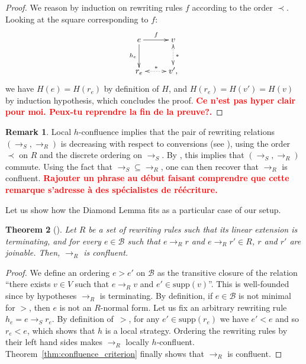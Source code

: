 \documentclass[10pt]{easychair}
\newtheorem{theorem}{Theorem}[section]
\theoremstyle{definition}
\newtheorem{remark}[theorem]{Remark}
\newcommand\todo[1]{{\bf\textcolor{red}{#1.}}}
\newcommand\supp{\text{supp}}
\newcommand\basis{\mathscr{B}}
\newcommand\rewR{\to_R}
\newcommand\rewS{\to_S}
\begin{document}
\begin{proof}
  We reason by induction on rewriting rules $f$ according to the order
  $\prec$. Looking at the square corresponding to $f$:
  \[
  \xymatrix @C = 2.5em @R = 2.5em{
    e 
    \ar [r] ^{f}
    \ar[d] _{h_e}
    &
    v
    \ar@{<.>} [d] ^{*}
    \\
    r_e
    \ar@{<.>} [r] ^{*}
    & 
    v',
  }
  \]
  we have $H(e)=H(r_e)$ by definition of $H$, and $H(r_e)=H(v')=H(v)$ by
  induction hypothesis, which concludes the proof.
  \todo{Ce n'est pas hyper clair pour moi. Peux-tu reprendre la fin de la
    preuve?}
\end{proof}
\medskip

\begin{remark}
  Local $h$-confluence implies that the pair of rewriting relations
  $(\rewS,\rewR)$ is decreasing with respect to conversions (see
  \cite[Definition 3]{van2008confluence}), using the order $\prec$ on $R$
  and the discrete ordering on $\rewS$. By
  \cite[Theorem 3]{van2008confluence}, this implies that $(\rewS,\rewR)$
  commute. Using the fact that $\rewS \subseteq \rewR$, one can then
  recover that $\rewR$ is confluent.
  \todo{Rajouter un phrase au début faisant comprendre que cette remarque
    s'adresse à des spécialistes de réécriture}
\end{remark}
\medskip

Let us show how the Diamond Lemma fits as a particular case of our setup.
\smallskip

\begin{theorem}[\cite{MR506890}]\label{thm:diamond_lemma}
  Let $R$ be a set of rewriting rules such that its linear extension is
  terminating, and for every $e\in\basis$ such that $e\rewR r$ and
  $e\rewR r'\in R$, $r$ and $r'$ are joinable. Then, $\rewR$ is
  confluent.
\end{theorem}

\begin{proof}
  We define an ordering $e>e'$ on $\basis$ as the transitive closure of
  the relation ``there exists $v\in V$ such that $e\rewR v$ and
  $e'\in\supp(v)$''. This is well-founded since by hypotheses $\rewR$ is
  terminating. By definition, if $e\in\basis$ is not minimal for $>$,
  then $e$ is not an $R$-normal form. Let us fix an arbitrary rewriting
  rule $h_e=e\rewS r_e$.  By definition of~$>$, for any $e'\in\supp(r_e)$
  we have $e'<e$ and so $r_e<e$, which shows that $h$ is a local
  strategy. Ordering the rewriting rules by their left hand sides makes
  $\rewR$ locally $h$-confluent. Theorem~\ref{thm:confluence_criterion}
  finally shows that $\rewR$ is confluent.   
\end{proof}
\end{document}
